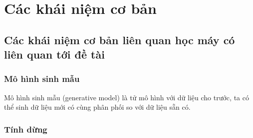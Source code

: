 
\chapter{Các khái niệm cơ bản}

%


\section{Các khái niệm cơ bản liên quan học máy có liên quan tới đề tài}
\subsection{Mô hình sinh mẫu}
Mô hình sinh mẫu (generative model) là tử mô hình với dữ liệu cho trước, ta có thể sinh dữ liệu mới có cùng phân phối so với dữ liệu sẵn có.


\subsection{Tính dừng}



